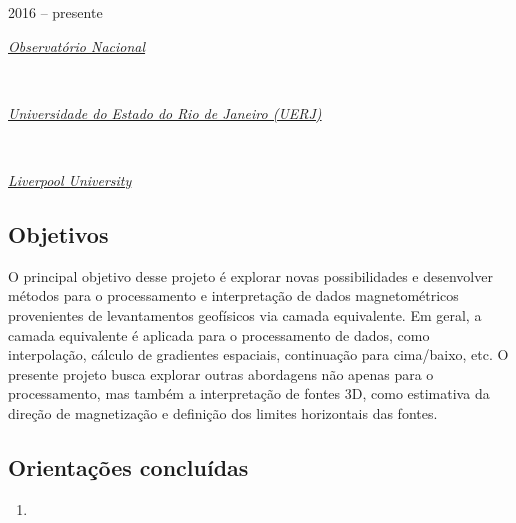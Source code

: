 2016 -- presente
\vspace{0.3\baselineskip}\\
\noindent\parbox{0.03\textwidth}{\vspace{-0.2\baselineskip}\faUniversity} \href{https://www.gov.br/observatorio/pt-br}{\textsl{Observatório Nacional}}
\parbox{0.03\textwidth}{\vspace{-0.2\baselineskip} \hfill {}} \\
\noindent\parbox{0.03\textwidth}{\vspace{-0.2\baselineskip}\faUniversity}
\href{https://www.uerj.br/}{\textsl{Universidade do Estado do Rio de Janeiro (UERJ)}}
\parbox{0.03\textwidth}{\vspace{-0.2\baselineskip} \hfill {}} \\
\noindent\parbox{0.03\textwidth}{\vspace{-0.2\baselineskip}\faUniversity}
\href{https://www.liverpool.ac.uk/}{\textsl{Liverpool University}}
\parbox{0.04\textwidth}{\vspace{-0.2\baselineskip} \hfill {}}

\subsection*{Objetivos}

O principal objetivo desse projeto é explorar novas possibilidades e desenvolver métodos
para o processamento e interpretação de dados magnetométricos provenientes de levantamentos 
geofísicos via camada equivalente. 
Em geral, a camada equivalente é aplicada para o processamento de dados, como interpolação,
cálculo de gradientes espaciais, continuação para cima/baixo, etc. O presente projeto busca 
explorar outras abordagens não apenas para o processamento, mas também a interpretação
de fontes 3D, como estimativa da direção de magnetização e definição dos limites horizontais 
das fontes.

\clearpage

\subsection*{Orientações concluídas}

\begin{enumerate}
	
	\item{}
	
\end{enumerate}

